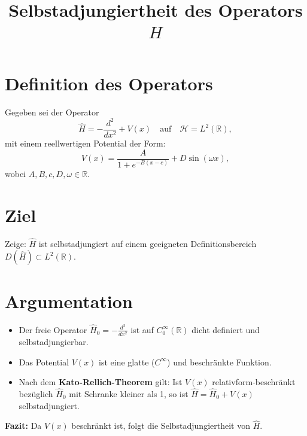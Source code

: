 \documentclass{article}
\title{Selbstadjungiertheit des Operators \(\hat{H}\)}
\author{}
\date{}
\begin{document}
\maketitle

\section*{Definition des Operators}
Gegeben sei der Operator
\[
\hat{H} = -\frac{d^2}{dx^2} + V(x)
\quad \text{auf} \quad \mathcal{H} = L^2(\mathbb{R}),
\]
mit einem reellwertigen Potential der Form:
\[
V(x) = \frac{A}{1 + e^{-B(x - c)}} + D\sin(\omega x),
\]
wobei \(A, B, c, D, \omega \in \mathbb{R}\).

\section*{Ziel}
Zeige: \(\hat{H}\) ist selbstadjungiert auf einem geeigneten Definitionsbereich \(D(\hat{H})\subset L^2(\mathbb{R})\).

\section*{Argumentation}
\begin{itemize}
    \item Der freie Operator \(\hat{H}_0 = -\frac{d^2}{dx^2}\) ist auf \(C_0^\infty(\mathbb{R})\) dicht definiert und selbstadjungierbar.
    \item Das Potential \(V(x)\) ist eine glatte (\(C^\infty\)) und beschränkte Funktion.
    \item Nach dem \textbf{Kato-Rellich-Theorem} gilt: Ist \(V(x)\) relativform-beschränkt bezüglich \(\hat{H}_0\) mit Schranke kleiner als 1, so ist \(\hat{H} = \hat{H}_0 + V(x)\) selbstadjungiert.
\end{itemize}

\textbf{Fazit:} Da \(V(x)\) beschränkt ist, folgt die Selbstadjungiertheit von \(\hat{H}\).
\end{document}
